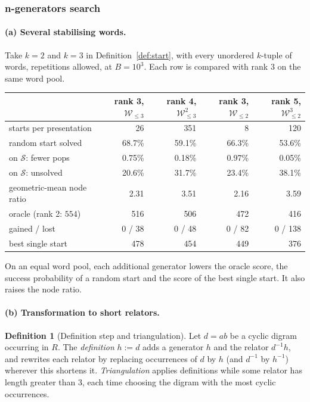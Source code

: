 \documentclass[11pt]{article}
\theoremstyle{definition}
\newtheorem{definition}[theorem]{Definition}
\theoremstyle{remark}
\newcommand{\Sol}{\mathcal{S}}
\newcommand{\W}{\mathcal{W}}
\begin{document}
\subsubsection{n-generators search}

\paragraph{(a) Several stabilising words.} Take $k=2$ and $k=3$ in Definition~\ref{def:start}, with every unordered
$k$-tuple of words, repetitions allowed, at $B=10^3$. Each row is compared with rank $3$ on the same word pool.

\begin{center}
\small
\begin{tabular}{lrrrr}
\toprule
& rank 3, $\W_{\le3}$ & rank 4, $\W_{\le3}^2$ & rank 3, $\W_{\le2}$ & rank 5, $\W_{\le2}^3$\\
\midrule
starts per presentation & 26 & 351 & 8 & 120\\
random start solved & 68.7\% & 59.1\% & 66.3\% & 53.6\%\\
on $\Sol$: fewer pops & 0.75\% & 0.18\% & 0.97\% & 0.05\%\\
on $\Sol$: unsolved & 20.6\% & 31.7\% & 23.4\% & 38.1\%\\
geometric-mean node ratio & 2.31 & 3.51 & 2.16 & 3.59\\
oracle (rank 2: $554$) & 516 & 506 & 472 & 416\\
gained / lost & 0 / 38 & 0 / 48 & 0 / 82 & 0 / 138\\
best single start & 478 & 454 & 449 & 376\\
\bottomrule
\end{tabular}
\end{center}

On an equal word pool, each additional generator lowers the oracle score, the success probability of a random start
and the score of the best single start. It also raises the node ratio.

\paragraph{(b) Transformation to short relators.}
\begin{definition}[Definition step and triangulation]
Let $d=ab$ be a cyclic digram occurring in $R$. The \emph{definition} $h:=d$ adds a generator $h$ and the relator
$d^{-1}h$, and rewrites each relator by replacing occurrences of $d$ by $h$ (and $d^{-1}$ by $h^{-1}$) wherever this
shortens it. \emph{Triangulation} applies definitions while some relator has length greater than $3$, each time choosing
the digram with the most cyclic occurrences.
\end{definition}
\end{document}
